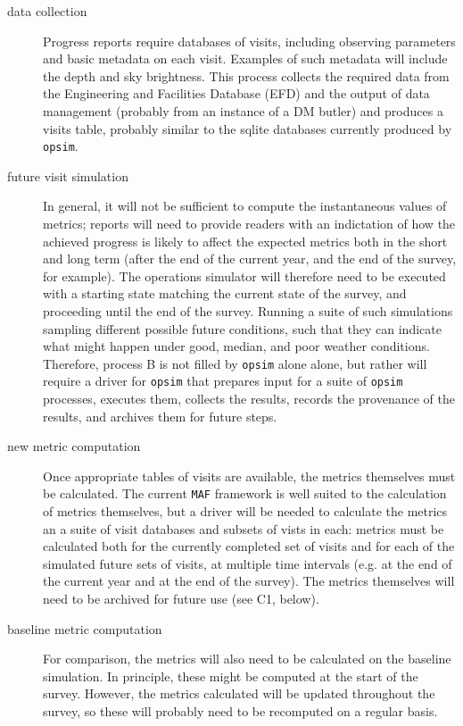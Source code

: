 \begin{description}
\item[{data collection}] Progress reports require databases of visits, including observing parameters and basic metadata on each visit. Examples of such metadata will include the depth and sky brightness. This process collects the required data from the Engineering and Facilities Database (EFD) and the output of data management (probably from an instance of a DM butler) and produces a visits table, probably similar to the sqlite databases currently produced by \texttt{opsim}.
\item[{future visit simulation}] In general, it will not be sufficient to compute the instantaneous values of metrics; reports will need to provide readers with an indictation of how the achieved progress is likely to affect the expected metrics both in the short and long term (after the end of the current year, and the end of the survey, for example). The operations simulator will therefore need to be executed with a starting state matching the current state of the survey, and proceeding until the end of the survey. Running a suite of such simulations sampling different possible future conditions, such that they can indicate what might happen under good, median, and poor weather conditions. Therefore, process B is not filled by \texttt{opsim} alone alone, but rather will require a driver for \texttt{opsim} that prepares input for a suite of \texttt{opsim} processes, executes them, collects the results, records the provenance of the results, and archives them for future steps.
\item[{new metric computation}] Once appropriate tables of visits are available, the metrics themselves must be calculated. The current \texttt{MAF} framework is well suited to the calculation of metrics themselves, but a driver will be needed to calculate the metrics an a suite of visit databases and subsets of vists in each: metrics must be calculated both for the currently completed set of visits and for each of the simulated future sets of visits, at multiple time intervals (e.g. at the end of the current year and at the end of the survey). The metrics themselves will need to be archived for future use (see C1, below).
\item[{baseline metric computation}] For comparison, the metrics will also need to be calculated on the baseline simulation. In principle, these might be computed at the start of the survey. However, the metrics calculated will be updated throughout the survey, so these will probably need to be recomputed on a regular basis.

\end{description}
